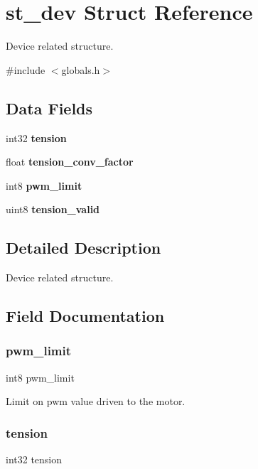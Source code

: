 \section{st\+\_\+dev Struct Reference}
\label{structst__dev}


Device related structure.  




{\ttfamily \#include $<$globals.\+h$>$}

\subsection*{Data Fields}
\begin{DoxyCompactItemize}
\item 
int32 \textbf{ tension}
\item 
float \textbf{ tension\+\_\+conv\+\_\+factor}
\item 
int8 \textbf{ pwm\+\_\+limit}
\item 
uint8 \textbf{ tension\+\_\+valid}
\end{DoxyCompactItemize}


\subsection{Detailed Description}
Device related structure. 



\subsection{Field Documentation}
\mbox{\label{structst__dev_a3c9f82ce5a972d95c47f841cda239f1c}} 
\subsubsection{pwm\+\_\+limit}
{\footnotesize\ttfamily int8 pwm\+\_\+limit}

Limit on pwm value driven to the motor. \mbox{\label{structst__dev_a5f564b9da8c38c743b9c10d967313f62}} 
\subsubsection{tension}
{\footnotesize\ttfamily int32 tension}

